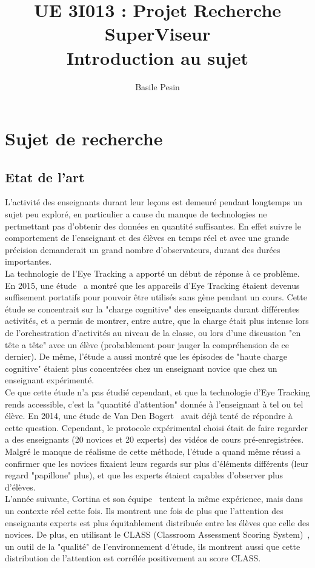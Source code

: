 \documentclass{article}
\title{UE 3I013 : Projet Recherche\\
    SuperViseur\\
    Introduction au sujet}
\author{Basile Pesin}
\begin{document}
\maketitle
\newpage

\section{Sujet de recherche}
\subsection{Etat de l'art}
L'activité des enseignants durant leur leçons est demeuré pendant longtemps un sujet peu exploré, en particulier a cause du manque de technologies ne pertmettant pas d'obtenir des données en quantité suffisantes. En effet suivre le comportement de l'enseignant et des élèves en temps réel et avec une grande précision demanderait un grand nombre d'observateurs, durant des durées importantes.\\
La technologie de l'Eye Tracking a apporté un début de réponse à ce problème. En 2015, une étude~\cite{OrchestrationLoad} a montré que les appareils d'Eye Tracking étaient devenus suffisement portatifs pour pouvoir être utilisés sans gène pendant un cours. Cette étude se concentrait sur la "charge cognitive" des enseignants durant différentes activités, et a permis de montrer, entre autre, que la charge était plus intense lors de l'orchestration d'activités au niveau de la classe, ou lors d'une discussion "en tête a tête" avec un élève (probablement pour jauger la compréhension de ce dernier). De même, l'étude a aussi montré que les épisodes de "haute charge cognitive" étaient plus concentrées chez un enseignant novice que chez un enseignant expérimenté.\\
Ce que cette étude n'a pas étudié cependant, et que la technologie d'Eye Tracking rends accessible, c'est la "quantité d'attention" donnée à l'enseignant à tel ou tel élève. En 2014, une étude de Van Den Bogert~\cite{VanDenBogert} avait déjà tenté de répondre à cette question. Cependant, le protocole expérimental choisi était de faire regarder a des enseignants (20 novices et 20 experts) des vidéos de cours pré-enregistrées. Malgré le manque de réalisme de cette méthode, l'étude a quand même réussi a confirmer que les novices fixaient leurs regards sur plus d'éléments différents (leur regard "papillone" plus), et que les experts étaient capables d'observer plus d'élèves.\\
L'année suivante, Cortina et son équipe~\cite{Cortina} tentent la même expérience, mais dans un contexte réel cette fois. Ils montrent une fois de plus que l'attention des enseignants experts est plus équitablement distribuée entre les élèves que celle des novices. De plus, en utilisant le CLASS (Classroom Assessment Scoring System)~\cite{CLASS}, un outil de la "qualité" de l'environnement d'étude, ils montrent aussi que cette distribution de l'attention est corrélée positivement au score CLASS.\\
\end{document}
